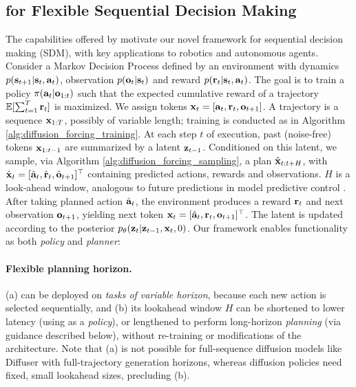 \subsection{\algo{} for Flexible Sequential Decision Making}
\label{sec:method_decision_making}
The capabilities offered by \algo{} motivate our novel framework for sequential decision making (SDM), with key applications to  robotics and autonomous agents. 
Consider a Markov Decision Process defined by an environment with dynamics $ p(\mathbf{s}_{t+1}|\mathbf{s}_t, \mathbf{a}_t)$, observation $ p(\mathbf{o}_{t}|\mathbf{s}_t)$ and reward $p(\mathbf{r}_t|\mathbf{s}_t, \mathbf{a}_t)$. The goal is to train a policy $\pi(\mathbf{a}_t|\mathbf{o}_{1:t})$ such that the expected cumulative reward of a trajectory $\Exp[\sum_{t=1}^{T} \br_t]$ is maximized. 
We assign tokens $\mathbf{x}_t = [\mathbf{a}_t, \mathbf{r}_t, \mathbf{o}_{t+1}]$.  A trajectory is a sequence $\mathbf{x}_{1:T}$, possibly of variable length;  training is conducted as in Algorithm \ref{alg:diffusion_forcing_training}. 
At each step $t$ of execution, past (noise-free) tokens $\mathbf{x}_{1:t-1}$ are  summarized by a latent $\mathbf{z}_{t-1}$.  Conditioned on this latent, we sample, via Algorithm \ref{alg:diffusion_forcing_sampling}, a plan $\hat{\mathbf{x}}_{t:t+H}$, with $\hat{\mathbf{x}}_{t}=[\hat{\mathbf{a}}_t, \hat{\mathbf{r}}_t, \hat{\mathbf{o}}_{t+1}]^\top$ containing predicted actions, rewards and observations. $H$ is a look-ahead window, analogous to future predictions in model predictive control \cite{garcia1989model}. After taking planned action $\hat{\mathbf{a}}_t$, the environment produces a reward $\mathbf{r}_t$ and next observation $\mathbf{o}_{t+1}$, yielding  next token $\mathbf{x}_t=[\hat{\mathbf{a}}_t, \mathbf{r}_t, \mathbf{o}_{t+1}]^\top$. The latent is updated according to the posterior $p_\theta(\mathbf{z}_{t}|\mathbf{z}_{t-1}, \mathbf{x}_t, 0)$. Our framework enables functionality as both \emph{policy} and \emph{planner}:


\paragraph{Flexible planning horizon.} \algons{} (a) can be deployed on \emph{tasks of variable horizon}, because each new action is selected sequentially, and  
(b) its lookahead window $H$ can be shortened to lower latency (using \algo{} as a \emph{policy}), or lengthened to perform long-horizon \emph{planning} (via guidance described below), without re-training or modifications of the architecture. Note that (a) is not possible for full-sequence diffusion models like Diffuser \cite{janner2022planning} with full-trajectory generation horizons, whereas diffusion policies \cite{chi2023diffusion} need fixed, small lookahead sizes, precluding (b). 


